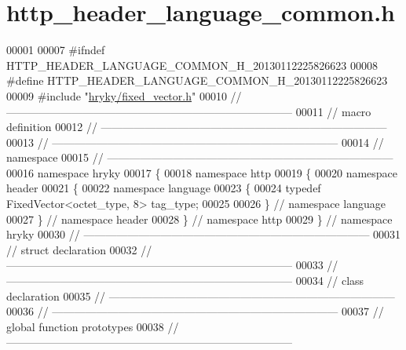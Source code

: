\hypertarget{http__header__language__common_8h_source}{\section{http\-\_\-header\-\_\-language\-\_\-common.\-h}
}

\begin{DoxyCode}
00001 
00007 \textcolor{preprocessor}{#ifndef HTTP\_HEADER\_LANGUAGE\_COMMON\_H\_20130112225826623}
00008 \textcolor{preprocessor}{}\textcolor{preprocessor}{#define HTTP\_HEADER\_LANGUAGE\_COMMON\_H\_20130112225826623}
00009 \textcolor{preprocessor}{}\textcolor{preprocessor}{#include "\hyperlink{fixed__vector_8h}{hryky/fixed_vector.h}"}
00010 \textcolor{comment}{//
      ------------------------------------------------------------------------------}
00011 \textcolor{comment}{// macro definition}
00012 \textcolor{comment}{//
      ------------------------------------------------------------------------------}
00013 \textcolor{comment}{//
      ------------------------------------------------------------------------------}
00014 \textcolor{comment}{// namespace}
00015 \textcolor{comment}{//
      ------------------------------------------------------------------------------}
00016 \textcolor{keyword}{namespace }hryky
00017 \{
00018 \textcolor{keyword}{namespace }http
00019 \{
00020 \textcolor{keyword}{namespace }header
00021 \{
00022 \textcolor{keyword}{namespace }language
00023 \{
00024     \textcolor{keyword}{typedef} FixedVector<octet\_type, 8> tag\_type;
00025     
00026 \} \textcolor{comment}{// namespace language}
00027 \} \textcolor{comment}{// namespace header}
00028 \} \textcolor{comment}{// namespace http}
00029 \} \textcolor{comment}{// namespace hryky}
00030 \textcolor{comment}{//
      ------------------------------------------------------------------------------}
00031 \textcolor{comment}{// struct declaration}
00032 \textcolor{comment}{//
      ------------------------------------------------------------------------------}
00033 \textcolor{comment}{//
      ------------------------------------------------------------------------------}
00034 \textcolor{comment}{// class declaration}
00035 \textcolor{comment}{//
      ------------------------------------------------------------------------------}
00036 \textcolor{comment}{//
      ------------------------------------------------------------------------------}
00037 \textcolor{comment}{// global function prototypes}
00038 \textcolor{comment}{//
      ------------------------------------------------------------------------------}

\end{DoxyCode}
